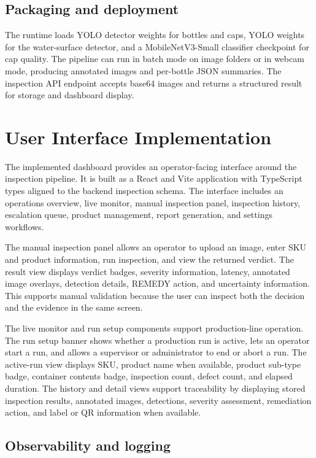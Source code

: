 \documentclass[12pt,a4paper]{report}
\begin{document}
\subsection{Packaging and deployment}
\label{subsec:packaging}

The runtime loads YOLO detector weights for bottles and caps, YOLO weights for the water-surface detector, and a MobileNetV3-Small classifier checkpoint for cap quality. The pipeline can run in batch mode on image folders or in webcam mode, producing annotated images and per-bottle JSON summaries. The inspection API endpoint accepts base64 images and returns a structured result for storage and dashboard display.

\section{User Interface Implementation}
\label{sec:ui-implementation}

The implemented dashboard provides an operator-facing interface around the inspection pipeline. It is built as a React and Vite application with TypeScript types aligned to the backend inspection schema. The interface includes an operations overview, live monitor, manual inspection panel, inspection history, escalation queue, product management, report generation, and settings workflows.

The manual inspection panel allows an operator to upload an image, enter SKU and product information, run inspection, and view the returned verdict. The result view displays verdict badges, severity information, latency, annotated image overlays, detection details, REMEDY action, and uncertainty information. This supports manual validation because the user can inspect both the decision and the evidence in the same screen.

The live monitor and run setup components support production-line operation. The run setup banner shows whether a production run is active, lets an operator start a run, and allows a supervisor or administrator to end or abort a run. The active-run view displays SKU, product name when available, product sub-type badge, container contents badge, inspection count, defect count, and elapsed duration. The history and detail views support traceability by displaying stored inspection results, annotated images, detections, severity assessment, remediation action, and label or QR information when available.

\subsection{Observability and logging}
\label{subsec:observability}
\end{document}
